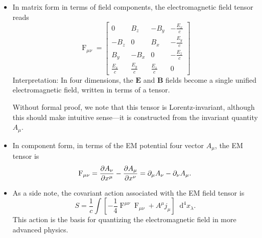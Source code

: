 \documentclass[11pt, a4paper]{article}
\newcommand{\diff}{\mathop{}\!\mathrm{d}} %
\renewcommand{\vec}[1]{\bm{#1}} %
\newcommand{\E}{\vec{E}} %
\newcommand{\B}{\vec{B}} %
\begin{document}
\begin{itemize}
	
	\item In matrix form in terms of field components, the electromagnetic field tensor reads
	\begin{equation*}
		\operatorname{F}_{\mu\nu} = 
	\begin{bmatrix}
        0 & B_{z} & - B_{y} & -\frac{E_{x}}{c}\\[1mm]
		- B_{z} & 0 & B_{x} & -\frac{E_{y}}{c}\\[1mm]
		B_{y} & -B_{x} & 0 & -\frac{E_{z}}{c}\\
		\frac{E_{x}}{c} & \frac{E_{y}}{c} & \frac{E_{z}}{c} & 0
	\end{bmatrix}
	\end{equation*}
    Interpretation: In four dimensions, the $ \E $ and $ \B $ fields become a single unified electromagnetic field, written in terms of a tensor.

	Without formal proof, we note that this tensor is Lorentz-invariant, although this should make intuitive sense---it is constructed from the invariant quantity $ A_{\mu} $.

    \item In component form, in terms of the EM potential four vector $ A_{\mu} $, the EM tensor is
	\begin{equation*}
        \operatorname{F}_{\mu \nu} = \pdv{A_{\nu}}{x^{\mu}} - \pdv{A_{\mu}}{x^{\nu}} = \partial_{\mu}A_{\nu} - \partial_{\nu}A_{\mu}.
	\end{equation*}

	\item As a side note, the covariant action associated with the EM field tensor is
	\begin{equation*}
		S = \frac{1}{c}\int \left[- \frac{1}{4}\operatorname{F}^{\mu\nu}\operatorname{F}_{\mu\nu} + A^{\mu}j_{\mu}\right]\diff^{4}x_{\lambda}.
	\end{equation*}
	This action is the basis for quantizing the electromagnetic field in more advanced physics.

\end{itemize}
\end{document}
